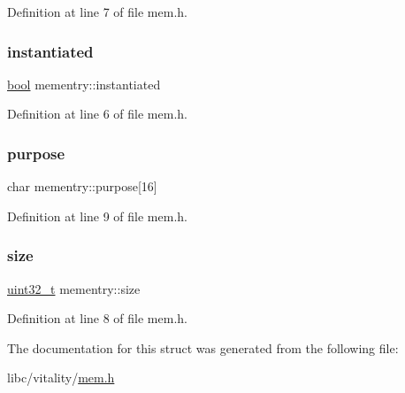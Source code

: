 Definition at line 7 of file mem.\+h.

\mbox{\label{a00164_a4342b85bc8bdb60635df7a30e1d30fa2_a4342b85bc8bdb60635df7a30e1d30fa2}} 
\subsubsection{\texorpdfstring{instantiated}{instantiated}}
{\footnotesize\ttfamily \hyperlink{a00095_af6a258d8f3ee5206d682d799316314b1_af6a258d8f3ee5206d682d799316314b1}{bool} mementry\+::instantiated}



Definition at line 6 of file mem.\+h.

\mbox{\label{a00164_a5ad2dd8cc879cbc1bc76459b1b314c81_a5ad2dd8cc879cbc1bc76459b1b314c81}} 
\subsubsection{\texorpdfstring{purpose}{purpose}}
{\footnotesize\ttfamily char mementry\+::purpose\mbox{[}16\mbox{]}}



Definition at line 9 of file mem.\+h.

\mbox{\label{a00164_a9a3a95abc18136ba568cd9d5e594c5c6_a9a3a95abc18136ba568cd9d5e594c5c6}} 
\subsubsection{\texorpdfstring{size}{size}}
{\footnotesize\ttfamily \hyperlink{a00095_a435d1572bf3f880d55459d9805097f62_a435d1572bf3f880d55459d9805097f62}{uint32\+\_\+t} mementry\+::size}



Definition at line 8 of file mem.\+h.



The documentation for this struct was generated from the following file\+:\begin{DoxyCompactItemize}
\item 
libc/vitality/\hyperlink{a00110}{mem.\+h}\end{DoxyCompactItemize}
